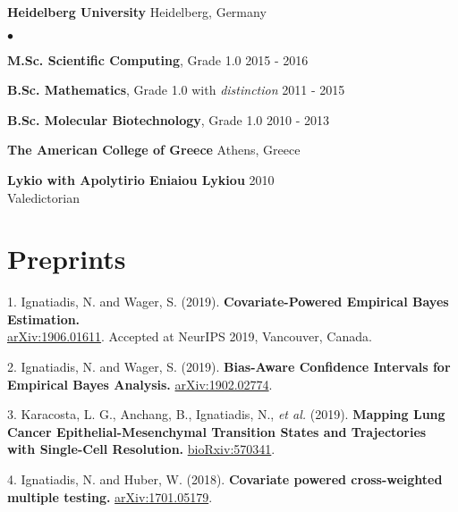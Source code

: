 \documentclass[margin,line]{res}
\newcommand{\g}{\textgreek}
\newenvironment{list1}{
  \begin{list}{\ding{113}}{%
      \setlength{\itemsep}{0in}
      \setlength{\parsep}{0in} \setlength{\parskip}{0in}
      \setlength{\topsep}{0in} \setlength{\partopsep}{0in}
      \setlength{\leftmargin}{0.17in}}}{\end{list}}
\newenvironment{list2}{
  \begin{list}{$\bullet$}{%
      \setlength{\itemsep}{0in}
      \setlength{\parsep}{0in} \setlength{\parskip}{0in}
      \setlength{\topsep}{0in} \setlength{\partopsep}{0in}
      \setlength{\leftmargin}{0.2in}}}{\end{list}}
\begin{document}
\begin{resume}
\vspace*{-2.5mm}
{\bf {Heidelberg University}} \hfill  {Heidelberg, Germany}\\
\vspace*{-.14in}
\begin{list2}
\item \textbf{M.Sc. Scientific Computing}, Grade 1.0 \hfill 2015 - 2016
\item \textbf{B.Sc. Mathematics}, Grade 1.0 with \emph{distinction} \hfill 2011 - 2015
\item \textbf{B.Sc. Molecular Biotechnology}, Grade 1.0 \hfill 2010 - 2013
\end{list2}

\vspace*{-2.5mm}
{\bf {{The American College of Greece}}} \hfill  {Athens, Greece}\\
\vspace*{-.14in}
\begin{list1}
\item[]
\textbf{Lykio with Apolytirio Eniaiou Lykiou}  \hfill 2010\\
Valedictorian
\end{list1}


\section{\sc Preprints}
\begin{list1}
\item[1.] Ignatiadis, N. and Wager, S. (2019). \textbf{Covariate-Powered Empirical Bayes Estimation.}\\\href{https://arxiv.org/abs/1906.01611}{arXiv:1906.01611}. Accepted at NeurIPS 2019, Vancouver, Canada.
\item[2.] Ignatiadis, N. and Wager, S. (2019). \textbf{Bias-Aware Confidence Intervals for Empirical Bayes Analysis.} \href{https://arxiv.org/abs/1902.02774}{arXiv:1902.02774}.
\item[3.] Karacosta, L. G., Anchang, B., Ignatiadis, N., \emph{et al.} (2019). \textbf{Mapping Lung Cancer Epithelial-Mesenchymal Transition States and Trajectories with Single-Cell Resolution.} \href{https://www.biorxiv.org/content/10.1101/570341v1}{bioRxiv:570341}.
\item[4.] Ignatiadis, N. and Huber, W. (2018). \textbf{Covariate powered cross-weighted multiple testing.} \href{https://arxiv.org/abs/1701.05179}{arXiv:1701.05179}.


\end{list1}
\end{resume}
\end{document}
